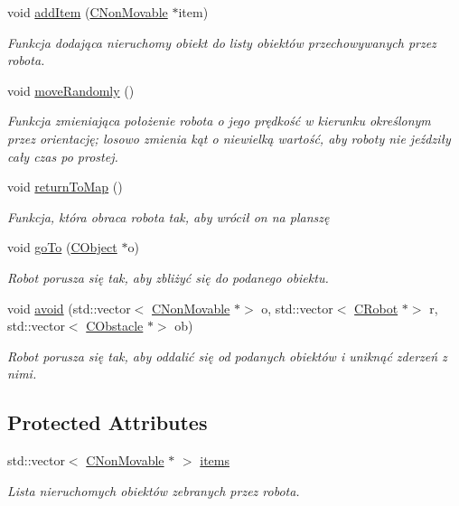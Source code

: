 \begin{DoxyCompactItemize}
void \mbox{\hyperlink{class_c_robot_a5d173b8f2c8fae09df01a8f1fc9211fb}{add\+Item}} (\mbox{\hyperlink{class_c_non_movable}{C\+Non\+Movable}} $\ast$item)
\begin{DoxyCompactList}\small\item\em Funkcja dodająca nieruchomy obiekt do listy obiektów przechowywanych przez robota. \end{DoxyCompactList}\item 
void \mbox{\hyperlink{class_c_robot_a9a819529f710ae6d9dc376c78e6c5657}{move\+Randomly}} ()
\begin{DoxyCompactList}\small\item\em Funkcja zmieniająca położenie robota o jego prędkość w kierunku określonym przez orientację; losowo zmienia kąt o niewielką wartość, aby roboty nie jeździły cały czas po prostej. \end{DoxyCompactList}\item 
void \mbox{\hyperlink{class_c_robot_adc5f5ff12284e09613bae149ed8ded2c}{return\+To\+Map}} ()
\begin{DoxyCompactList}\small\item\em Funkcja, która obraca robota tak, aby wrócił on na planszę \end{DoxyCompactList}\item 
void \mbox{\hyperlink{class_c_robot_a9bab21d24d736824d37283811abfb5fd}{go\+To}} (\mbox{\hyperlink{class_c_object}{C\+Object}} $\ast$o)
\begin{DoxyCompactList}\small\item\em Robot porusza się tak, aby zbliżyć się do podanego obiektu. \end{DoxyCompactList}\item 
void \mbox{\hyperlink{class_c_robot_ae667593c574d4ec859de15d5ae7e7c22}{avoid}} (std\+::vector$<$ \mbox{\hyperlink{class_c_non_movable}{C\+Non\+Movable}} $\ast$$>$ o, std\+::vector$<$ \mbox{\hyperlink{class_c_robot}{C\+Robot}} $\ast$$>$ r, std\+::vector$<$ \mbox{\hyperlink{class_c_obstacle}{C\+Obstacle}} $\ast$$>$ ob)
\begin{DoxyCompactList}\small\item\em Robot porusza się tak, aby oddalić się od podanych obiektów i uniknąć zderzeń z nimi. \end{DoxyCompactList}\end{DoxyCompactItemize}
\subsection*{Protected Attributes}
\begin{DoxyCompactItemize}
\item 
std\+::vector$<$ \mbox{\hyperlink{class_c_non_movable}{C\+Non\+Movable}} $\ast$ $>$ \mbox{\hyperlink{class_c_robot_a8f676285c6d121ae209047b467c48947}{items}}
\begin{DoxyCompactList}\small\item\em Lista nieruchomych obiektów zebranych przez robota. \end{DoxyCompactList}\end{DoxyCompactItemize}


